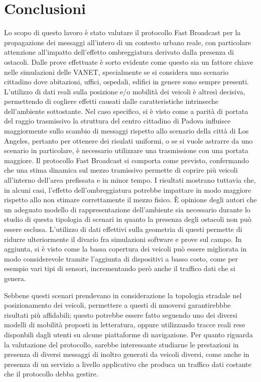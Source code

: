 
\chapter{Conclusioni}\label{chap:conclusioni}
Lo scopo di questo lavoro è stato valutare il protocollo Fast Broadcast per la propagazione dei messaggi
all'intero di un contesto urbano reale, con particolare attenzione all'impatto dell'effetto ombreggiatura derivato dalla
presenza di ostacoli.
Dalle prove effettuate è sorto evidente come questo sia un fattore chiave nelle simulazioni delle VANET,
specialmente se si considera uno scenario cittadino dove abitazioni, uffici, ospedali, edifici in genere sono sempre presenti.
L'utilizzo di dati reali sulla posizione e/o mobilità dei veicoli è altresì decisiva,
permettendo di cogliere effetti causati dalle caratteristiche intrinseche dell'ambiente sottostante.
Nel caso specifico, si è visto come a parità di portata del raggio trasmissivo la struttura
del centro cittadino di Padova influisce maggiormente sullo scambio di messaggi
rispetto allo scenario della città di Los Angeles,
pertanto per ottenere dei risulati uniformi, o se si vuole astrarre da uno scenario in particolare,
è necessario utilizzare una trasmissione con una portata maggiore.	%
Il protocollo Fast Broadcast si comporta come previsto, confermando che una stima dinamica sul mezzo
tramissivo permette di coprire più veicoli all'interno dell'area prefissata e in minor tempo.
I risultati mostrano tuttavia che, in alcuni casi, l'effetto dell'ombreggiatura
potrebbe impattare in modo maggiore rispetto allo non stimare correttamente il mezzo fisico. %
È opinione degli autori che un adeguato modello di rappresentazione dell'ambiente sia
necessario durante lo studio di questa tipologia di scenari in quanto la presenza degli ostacoli non può essere esclusa.
L'utilizzo di dati effettivi sulla geometria di questi permette di ridurre ulteriormente il divario fra simulazioni software e prove sul campo.
In aggiunta, si è visto come la bassa copertura dei veicoli può essere migliorata in modo considerevole tramite l'aggiunta
di dispositivi a basso costo, come per esempio vari tipi di sensori, incrementando però anche il traffico dati che si genera.

Sebbene questi scenari prendevano in considerazione la topologia stradale nel posizionamento dei veicoli,
permettere a questi di muoversi garantirebbbe risultati più affidabili;
questo potrebbe essere fatto seguendo uno dei diversi modelli di mobilità proposti in letteratura,
oppure utilizzando tracce reali rese disponbili dagli utenti su alcune piattaforme di navigazione.
Per quanto riguarda la valutazione del protocollo, sarebbe interessante studiarne
le prestazioni in presenza di diversi messaggi di inoltro generati da veicoli diversi,
come anche in presenza di un servizio a livello applicativo che produca un traffico dati costante
che il protocollo debba gestire.

